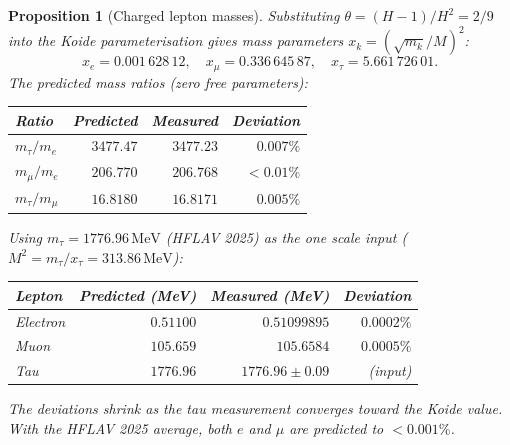 \documentclass[11pt,a4paper]{article}
\let\hline\midrule
\newtheorem{proposition}[theorem]{Proposition}
\theoremstyle{definition}
\theoremstyle{remark}
\begin{document}
\begin{proposition}[Charged lepton masses]\label{prop:lepton_masses}
Substituting $\theta=(H-1)/H^2=2/9$ into the Koide parameterisation gives mass parameters $x_k=({\sqrt{m_k}}/{M})^2$:
\[
x_e = 0.001\,628\,12,\quad x_\mu = 0.336\,645\,87,\quad x_\tau = 5.661\,726\,01.
\]
The predicted mass ratios (zero free parameters):
\begin{center}
\begin{tabular}{lrrr}
\hline
Ratio & Predicted & Measured & Deviation \\
\hline
$m_\tau/m_e$ & $3477.47$ & $3477.23$ & $0.007\%$ \\
$m_\mu/m_e$ & $206.770$ & $206.768$ & ${<}0.01\%$ \\
$m_\tau/m_\mu$ & $16.8180$ & $16.8171$ & $0.005\%$ \\
\hline
\end{tabular}
\end{center}
Using $m_\tau=1776.96\,\mathrm{MeV}$ (HFLAV 2025) as the one scale input ($M^2=m_\tau/x_\tau=313.86\,\mathrm{MeV}$):
\begin{center}
\begin{tabular}{lrrr}
\hline
Lepton & Predicted (MeV) & Measured (MeV) & Deviation \\
\hline
Electron & $0.51100$ & $0.51099895$ & $0.0002\%$ \\
Muon & $105.659$ & $105.6584$ & $0.0005\%$ \\
Tau & $1776.96$ & $1776.96\pm 0.09$ & (input) \\
\hline
\end{tabular}
\end{center}
The deviations shrink as the tau measurement converges toward the Koide value. With the HFLAV 2025 average, both $e$ and $\mu$ are predicted to $<0.001\%$.
\end{proposition}
\end{document}
